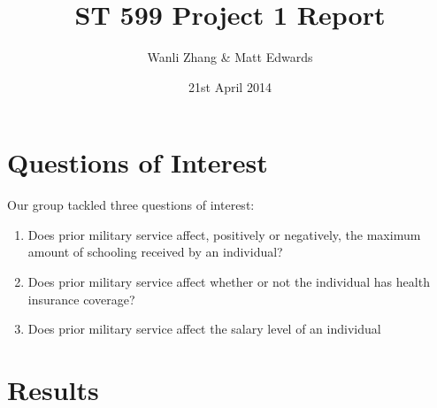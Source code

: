 \documentclass{article}
\title{ST 599 Project 1 Report}
\author{Wanli Zhang \& Matt Edwards}
\date{21st April 2014}
\begin{document}
\maketitle


\section{Questions of Interest}
Our group tackled three questions of interest:

\begin{enumerate}

\item Does prior military service affect, positively or negatively, the maximum amount of schooling received by an individual? %
\item Does prior military service affect whether or not the individual has health insurance coverage? 
\item Does prior military service affect the salary level of an individual
\end{enumerate}

\section{Results}
\begin{figure}[h!]
\begin{floatrow}
\end{floatrow}
\end{figure}
\end{document}
